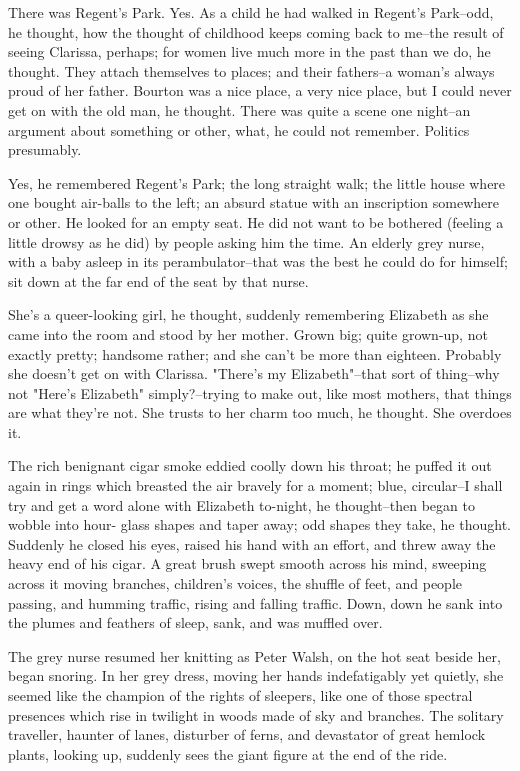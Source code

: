 \documentclass[lang=cn,10pt]{elegantbook}
\begin{document}
There was Regent's Park.  Yes.  As a child he had walked in
Regent's Park--odd, he thought, how the thought of childhood keeps
coming back to me--the result of seeing Clarissa, perhaps; for
women live much more in the past than we do, he thought.  They
attach themselves to places; and their fathers--a woman's always
proud of her father.  Bourton was a nice place, a very nice place,
but I could never get on with the old man, he thought.  There was
quite a scene one night--an argument about something or other,
what, he could not remember.  Politics presumably.

Yes, he remembered Regent's Park; the long straight walk; the
little house where one bought air-balls to the left; an absurd
statue with an inscription somewhere or other.  He looked for an
empty seat.  He did not want to be bothered (feeling a little
drowsy as he did) by people asking him the time.  An elderly grey
nurse, with a baby asleep in its perambulator--that was the best he
could do for himself; sit down at the far end of the seat by that
nurse.

She's a queer-looking girl, he thought, suddenly remembering
Elizabeth as she came into the room and stood by her mother.  Grown
big; quite grown-up, not exactly pretty; handsome rather; and she
can't be more than eighteen.  Probably she doesn't get on with
Clarissa.  "There's my Elizabeth"--that sort of thing--why not
"Here's Elizabeth" simply?--trying to make out, like most mothers,
that things are what they're not.  She trusts to her charm too
much, he thought.  She overdoes it.

The rich benignant cigar smoke eddied coolly down his throat; he
puffed it out again in rings which breasted the air bravely for a
moment; blue, circular--I shall try and get a word alone with
Elizabeth to-night, he thought--then began to wobble into hour-
glass shapes and taper away; odd shapes they take, he thought.
Suddenly he closed his eyes, raised his hand with an effort, and
threw away the heavy end of his cigar.  A great brush swept smooth
across his mind, sweeping across it moving branches, children's
voices, the shuffle of feet, and people passing, and humming
traffic, rising and falling traffic.  Down, down he sank into the
plumes and feathers of sleep, sank, and was muffled over.



The grey nurse resumed her knitting as Peter Walsh, on the hot seat
beside her, began snoring.  In her grey dress, moving her hands
indefatigably yet quietly, she seemed like the champion of the
rights of sleepers, like one of those spectral presences which rise
in twilight in woods made of sky and branches.  The solitary
traveller, haunter of lanes, disturber of ferns, and devastator of
great hemlock plants, looking up, suddenly sees the giant figure at
the end of the ride.
\end{document}
